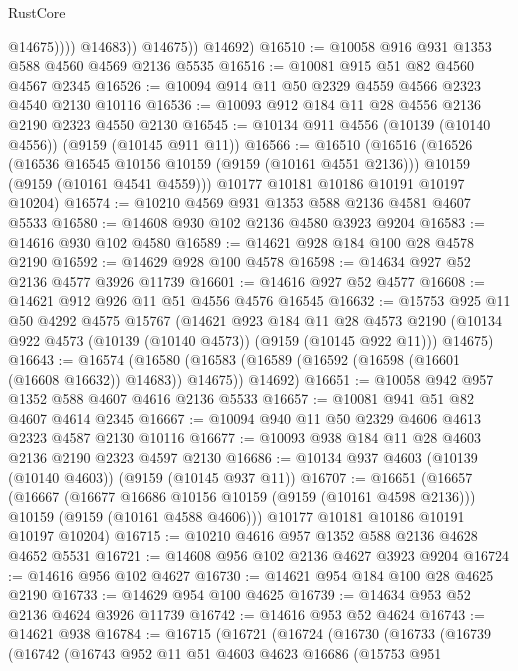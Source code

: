 \begin{lexlean}{RustCore}
\begin{coremodule}
                      @14675))))
              @14683))
          @14675))
      @14692)
@16510 := @10058 @916 @931 @1353 @588 @4560 @4569 @2136 @5535
@16516 := @10081 @915 @51 @82 @4560 @4567 @2345
@16526 := @10094 @914 @11 @50 @2329 @4559 @4566 @2323 @4540 @2130 @10116
@16536 := @10093 @912 @184 @11 @28 @4556 @2136 @2190 @2323 @4550 @2130
@16545 := @10134 @911 @4556 (@10139 (@10140 @4556)) (@9159 (@10145 @911 @11))
@16566 := @16510
    (@16516
      (@16526
        (@16536 @16545 @10156 @10159 (@9159 (@10161 @4551 @2136)))
        @10159
        (@9159 (@10161 @4541 @4559)))
      @10177
      @10181
      @10186
      @10191
      @10197
      @10204)
@16574 := @10210 @4569 @931 @1353 @588 @2136 @4581 @4607 @5533
@16580 := @14608 @930 @102 @2136 @4580 @3923 @9204
@16583 := @14616 @930 @102 @4580
@16589 := @14621 @928 @184 @100 @28 @4578 @2190
@16592 := @14629 @928 @100 @4578
@16598 := @14634 @927 @52 @2136 @4577 @3926 @11739
@16601 := @14616 @927 @52 @4577
@16608 := @14621 @912 @926 @11 @51 @4556 @4576 @16545
@16632 := @15753
    @925
    @11
    @50
    @4292
    @4575
    @15767
    (@14621
      @923
      @184
      @11
      @28
      @4573
      @2190
      (@10134 @922 @4573 (@10139 (@10140 @4573)) (@9159 (@10145 @922 @11)))
      @14675)
@16643 := @16574
    (@16580 (@16583 (@16589 (@16592 (@16598 (@16601 (@16608 @16632)) @14683)) @14675)) @14692)
@16651 := @10058 @942 @957 @1352 @588 @4607 @4616 @2136 @5533
@16657 := @10081 @941 @51 @82 @4607 @4614 @2345
@16667 := @10094 @940 @11 @50 @2329 @4606 @4613 @2323 @4587 @2130 @10116
@16677 := @10093 @938 @184 @11 @28 @4603 @2136 @2190 @2323 @4597 @2130
@16686 := @10134 @937 @4603 (@10139 (@10140 @4603)) (@9159 (@10145 @937 @11))
@16707 := @16651
    (@16657
      (@16667
        (@16677 @16686 @10156 @10159 (@9159 (@10161 @4598 @2136)))
        @10159
        (@9159 (@10161 @4588 @4606)))
      @10177
      @10181
      @10186
      @10191
      @10197
      @10204)
@16715 := @10210 @4616 @957 @1352 @588 @2136 @4628 @4652 @5531
@16721 := @14608 @956 @102 @2136 @4627 @3923 @9204
@16724 := @14616 @956 @102 @4627
@16730 := @14621 @954 @184 @100 @28 @4625 @2190
@16733 := @14629 @954 @100 @4625
@16739 := @14634 @953 @52 @2136 @4624 @3926 @11739
@16742 := @14616 @953 @52 @4624
@16743 := @14621 @938
@16784 := @16715
    (@16721
      (@16724
        (@16730
          (@16733
            (@16739
              (@16742
                (@16743
                  @952
                  @11
                  @51
                  @4603
                  @4623
                  @16686
                  (@15753
                    @951

\end{coremodule}
\end{lexlean}
